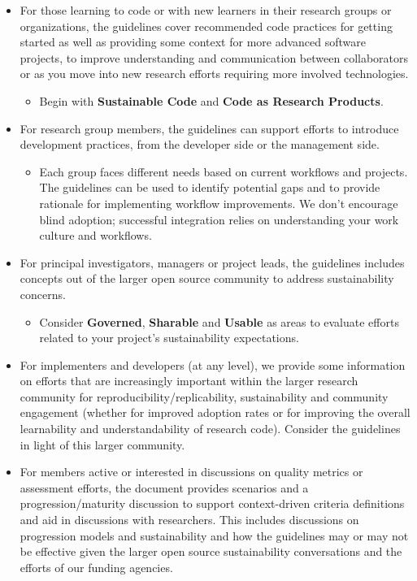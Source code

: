 \documentclass{article}
\begin{document}
\begin{itemize}
\item For those learning to code or with new learners in their research groups or organizations, the guidelines cover recommended code practices for getting started as well as providing some context for more advanced software projects, to improve understanding and communication between collaborators or as you move into new research efforts requiring more involved technologies. 
\begin{itemize}
\item Begin with \textbf{Sustainable Code} and \textbf{Code as Research Products}.
\end{itemize}
\item For research group members, the guidelines can support efforts to introduce development practices, from the developer side or the management side. 
\begin{itemize}
\item Each group faces different needs based on current workflows and projects. The guidelines can be used to identify potential gaps and to provide rationale for implementing workflow improvements. We don’t encourage blind adoption; successful integration relies on understanding your work culture and workflows. 
\end{itemize}
\item For principal investigators, managers or project leads, the guidelines includes concepts out of the larger open source community to address sustainability concerns.
\begin{itemize}
\item Consider \textbf{Governed}, \textbf{Sharable} and \textbf{Usable} as areas to evaluate efforts related to your project’s sustainability expectations.
\end{itemize}
\item For implementers and developers (at any level), we provide some information on efforts that are increasingly important within the larger research community for reproducibility/replicability, sustainability and community engagement (whether for improved adoption rates or for improving the overall learnability and understandability of research code). Consider the guidelines in light of this larger community.
\item For members active or interested in discussions on quality metrics or assessment efforts, the document provides scenarios and a progression/maturity discussion to support context-driven criteria definitions and aid in discussions with researchers. This includes discussions on progression models and sustainability and how the guidelines may or may not be effective given the larger open source sustainability conversations and the efforts of our funding agencies.  
\end{itemize}
\end{document}
